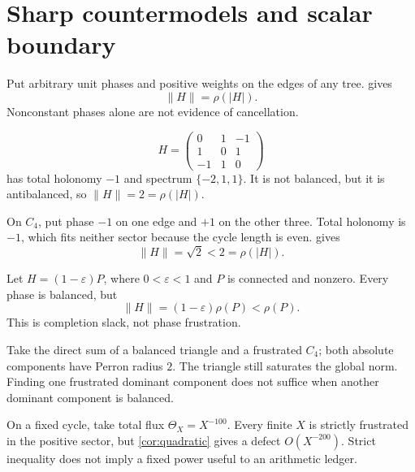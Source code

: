 \section{Sharp countermodels and scalar boundary}
\label{sec:countermodels}

\begin{example}
Put arbitrary unit phases and positive weights on the edges of any
tree.   gives
\[
 \|H\|=\rho(|H|).
\]
Nonconstant phases alone are not evidence of cancellation.
\end{example}

\begin{example}\label{ex:triangle}
\[
 H=
 \begin{pmatrix}
 0&1&-1\\
 1&0&1\\
 -1&1&0
 \end{pmatrix}
\]
has total holonomy \(-1\) and spectrum \(\{-2,1,1\}\).  It is not
balanced, but it is antibalanced, so
\(\|H\|=2=\rho(|H|)\).
\end{example}

\begin{example}
On \(C_4\), put phase \(-1\) on one edge and \(+1\) on the other
three.  Total holonomy is \(-1\), which fits neither sector because the
cycle length is even.   gives
\[
 \|H\|=\sqrt2<2=\rho(|H|).
\]
\end{example}

\begin{example}
Let \(H=(1-\varepsilon)P\), where \(0<\varepsilon<1\) and \(P\) is
connected and nonzero.  Every phase is balanced, but
\[
 \|H\|=(1-\varepsilon)\rho(P)<\rho(P).
\]
This is completion slack, not phase frustration.
\end{example}

\begin{example}
Take the direct sum of a balanced triangle and a frustrated \(C_4\);
both absolute components have Perron radius \(2\).  The triangle still
saturates the global norm.  Finding one frustrated dominant component
does not suffice when another dominant component is balanced.
\end{example}

\begin{example}
On a fixed cycle, take total flux \(\Theta_X=X^{-100}\).  Every finite
\(X\) is strictly frustrated in the positive sector, but
\cref{cor:quadratic} gives a defect \(O(X^{-200})\).  Strict inequality
does not imply a fixed power useful to an arithmetic ledger.
\end{example}

